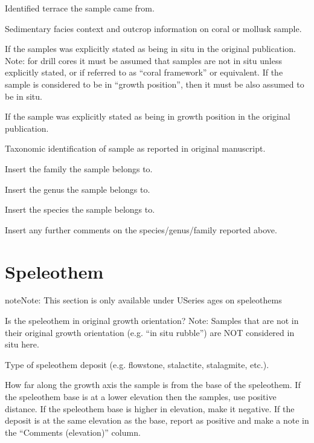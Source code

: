 \documentclass[letterpaper,10pt,english]{sphinxmanual}
\begin{document}
 \sphinxhyphen{} Identified terrace the sample came from.

 \sphinxhyphen{} Sedimentary facies context and outcrop information on coral or mollusk sample.

 \sphinxhyphen{} If the samples was explicitly stated as being in situ in the original publication. Note: for drill cores it must be assumed that samples are not in situ unless explicitly stated, or if referred to as “coral framework” or equivalent. If the sample is considered to be in “growth position”, then it must be also assumed to be in situ.

 \sphinxhyphen{} If the sample was explicitly stated as being in growth position in the original publication.

 \sphinxhyphen{} Taxonomic identification of sample as reported in original manuscript.

      \sphinxhyphen{} Insert the family the sample belongs to.

 \sphinxhyphen{} Insert the genus the sample belongs to.

     \sphinxhyphen{} Insert the species the sample belongs to.

 \sphinxhyphen{} Insert any further comments on the species/genus/family reported above.


\section{Speleothem}
\label{\detokenize{Useries:speleothem}}
\begin{sphinxadmonition}{note}{Note:}
This section is only available under U\sphinxhyphen{}Series ages on speleothems
\end{sphinxadmonition}

 \sphinxhyphen{} Is the speleothem in original growth orientation? Note: Samples that are not in their original growth orientation (e.g. “in situ rubble”) are NOT considered in situ here.

 \sphinxhyphen{} Type of speleothem deposit (e.g. flowstone, stalactite, stalagmite, etc.).

 \sphinxhyphen{} How far along the growth axis the sample is from the base of the speleothem. If the speleothem base is at a lower elevation then the samples, use positive distance. If the speleothem base is higher in elevation, make it negative. If the deposit is at the same elevation as the base, report as positive and make a note in the “Comments (elevation)” column.
\end{document}
